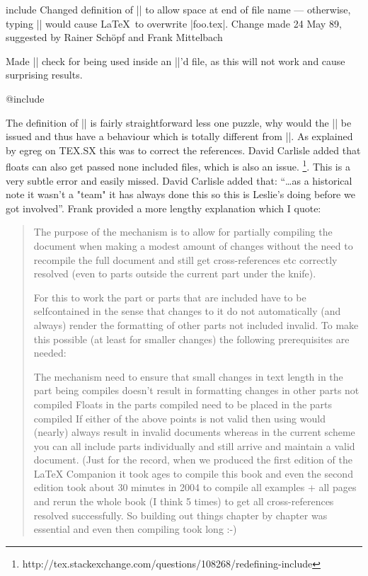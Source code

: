 \begin{multicols}
\begin{docCmd}{include}{}
 Changed definition of || to allow space at end of file name
 --- otherwise, typing || would cause \LaTeX\ to
 overwrite |foo.tex|.  Change made 24 May 89, suggested by Rainer
 Sch\"opf  and Frank Mittelbach

 Made || check for being used inside an ||'d file, as
 this will not work and cause surprising results.
\end{docCmd}
%
 \begin{docCmd}{@include}{}
 
 The definition of |\@include| is fairly
 straightforward less one puzzle, why would the |\clearpage| be
 issued and thus have a behaviour which is totally different from
 ||. As explained by egreg on TEX.SX this was to correct the references.
 David Carlisle added that floats can also get passed none included
 files, which is also an issue.
 \footnote{http://tex.stackexchange.com/questions/108268/redefining-include}. This is a very subtle error and easily missed. David Carlisle added that: ``\ldots as a historical note it wasn't a "team" it has always done this so this is Leslie's doing before we got involved''.
Frank provided a more lengthy explanation which I quote:
\begin{quotation}
The purpose of the  mechanism is to allow for partially compiling the document when making a modest amount of changes without the need to recompile the full document and still get cross-references etc correctly resolved (even to parts outside the current part under the knife).

For this to work the part or parts that are included have to be selfcontained in the sense that changes to it do not automatically (and always) render the formatting of other parts not included invalid. To make this possible (at least for smaller changes) the following prerequisites are needed:

The mechanism need to ensure that small changes in text length in the part being compiles doesn't result in formatting changes in other parts not compiled
Floats in the parts compiled need to be placed in the parts compiled
If either of the above points is not valid then using  would (nearly) always result in invalid documents whereas in the current scheme you can all include parts individually and still arrive and maintain a valid document. (Just for the record, when we produced the first edition of the LaTeX Companion it took ages to compile this book and even the second edition took about 30 minutes in 2004 to compile all examples + all pages and rerun the whole book (I think 5 times) to get all cross-references resolved successfully. So building out things chapter by chapter was essential and even then compiling took long :-)


\end{quotation}
\end{docCmd}
\end{multicols}
